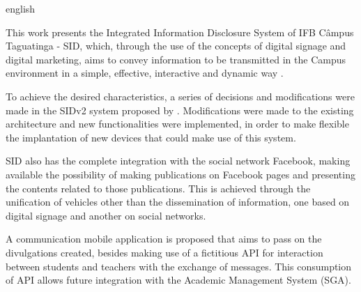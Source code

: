 \begin{resumo}[Abstract]
 \begin{otherlanguage*}{english}
   
This work presents the Integrated Information Disclosure System of IFB Câmpus Taguatinga - SID, which, through the use of the concepts of digital signage and digital marketing, aims to convey information to be transmitted in the Campus environment in a simple, effective, interactive and dynamic way .

To achieve the desired characteristics, a series of decisions and modifications were made in the SIDv2 system proposed by \cite{sobrinho2017}. Modifications were made to the existing architecture and new functionalities were implemented, in order to make flexible the implantation of new devices that could make use of this system.

SID also has the complete integration with the social network Facebook, making available the possibility of making publications on Facebook pages and presenting the contents related to those publications. This is achieved through the unification of vehicles other than the dissemination of information, one based on digital signage and another on social networks.

A communication mobile application is proposed that aims to pass on the divulgations created, besides making use of a fictitious API for interaction between students and teachers with the exchange of messages. This consumption of API allows future integration with the Academic Management System (SGA).

   \vspace{\onelineskip}
 
   \noindent 
 \end{otherlanguage*}
\end{resumo}
